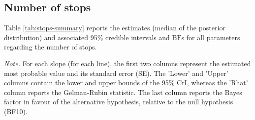 \documentclass[
  11pt,
  english,
  ,doc,floatsintext]{apa6}
\newenvironment{lltable}{\begin{landscape}\centering\begin{ThreePartTable}}{\end{ThreePartTable}\end{landscape}}
\begin{document}
\hypertarget{number-of-stops}{%
\subsection{Number of stops}\label{number-of-stops}}

Table \ref{tab:stops-summary} reports the estimates (median of the posterior distribution) and associated 95\% credible intervals and \(\text{BF}\)s for all parameters regarding the number of stops.

\begin{lltable}

\begin{TableNotes}[para]
\normalsize{\textit{Note.} For each slope (for each line), the first two columns represent the
    estimated most probable value and its standard error (SE). The 'Lower' and
    'Upper' columns contain the lower and upper bounds of the 95\% CrI, whereas
    the 'Rhat' column reports the Gelman-Rubin statistic. The last column reports
    the Bayes factor in favour of the alternative hypothesis, relative to the
    null hypothesis (BF10).}
\end{TableNotes}

\scriptsize{

}
\end{lltable}
\end{document}
